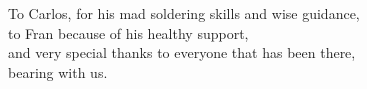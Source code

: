 	
	\cleardoublepage
	\null{}
	\begin{flushright}
		To Carlos, for his mad soldering skills and wise guidance,\\
		to Fran because of his healthy support,\\
		and very special thanks to everyone that has been there,\\
		bearing with us.
	\end{flushright}
	\null